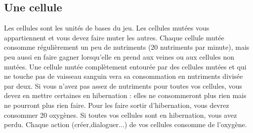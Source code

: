 \documentclass{article}
\begin{document}
\subsection{Une cellule}\label{cellule}
Les cellules sont les unités de bases du jeu. Les cellules mutées vous appartiennent et vous devez faire muter les autres. Chaque cellule mutée consomme régulièrement un peu de nutriments (20 nutriments par minute), mais peu aussi en faire gagner lorsqu'elle en prend aux veines ou aux cellules non mutées. Une cellule mutée complètement entourée par des cellules mutées et qui ne touche pas de vaisseau sanguin vera sa consommation en nutriments divisée par deux. Si vous n'avez pas assez de nutriments pour toutes vos cellules, vous devez en mettre certaines en hibernation : elles ne consommeront plus rien mais ne pourront plus rien faire. Pour les faire sortir d'hibernation, vous devrez consommer 20 oxygènes. Si toutes vos cellules sont en hibernation, vous avez perdu. Chaque action (créer,dialoguer...) de vos cellules consomme de l'oxygène.
\end{document}
